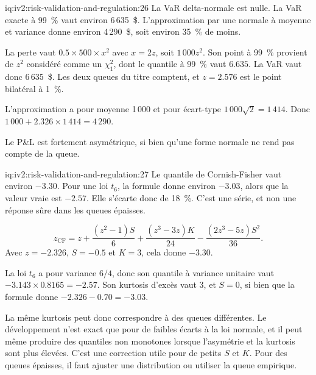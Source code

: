 \begin{solution}{iq:iv2:risk-validation-and-regulation:26}
La VaR delta-normale est nulle. La VaR exacte à 99~\% vaut environ 6\,635~\$. L'approximation par une normale à moyenne et variance donne environ 4\,290~\$, soit environ 35~\% de moins.

La perte vaut $0.5 \times 500 \times x^2$ avec $x = 2z$, soit $1\,000 z^2$. Son point à 99~\% provient de $z^2$ considéré comme un $\chi^2_1$, dont le quantile à 99~\% vaut $6.635$. La VaR vaut donc 6\,635~\$. Les deux queues du titre comptent, et $z = 2.576$ est le point bilatéral à 1~\%.

L'approximation a pour moyenne 1\,000 et pour écart-type $1\,000\sqrt{2} = 1\,414$. Donc $1\,000 + 2.326 \times 1\,414 = 4\,290$.

Le P\&L est fortement asymétrique, si bien qu'une forme normale ne rend pas compte de la queue.

\end{solution}

\begin{solution}{iq:iv2:risk-validation-and-regulation:27}
Le quantile de Cornish-Fisher vaut environ $-3.30$. Pour une loi $t_6$, la formule donne environ $-3.03$, alors que la valeur vraie est $-2.57$. Elle s'écarte donc de 18~\%. C'est une série, et non une réponse sûre dans les queues épaisses.

\[
z_{\mathrm{CF}} = z + \frac{(z^2 - 1)S}{6} + \frac{(z^3 - 3z)K}{24} - \frac{(2z^3 - 5z)S^2}{36}.
\]
Avec $z = -2.326$, $S = -0.5$ et $K = 3$, cela donne $-3.30$.

La loi $t_6$ a pour variance $6/4$, donc son quantile à variance unitaire vaut $-3.143 \times 0.8165 = -2.57$. Son kurtosis d'excès vaut 3, et $S = 0$, si bien que la formule donne $-2.326 - 0.70 = -3.03$.

La même kurtosis peut donc correspondre à des queues différentes. Le développement n'est exact que pour de faibles écarts à la loi normale, et il peut même produire des quantiles non monotones lorsque l'asymétrie et la kurtosis sont plus élevées. C'est une correction utile pour de petits $S$ et $K$. Pour des queues épaisses, il faut ajuster une distribution ou utiliser la queue empirique.

\end{solution}

